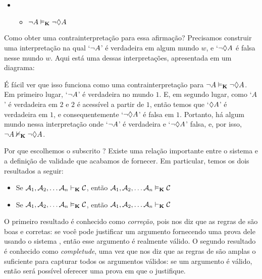 \begin{itemize}
	\item[]
	      \begin{itemize}
		      \item[]$\neg A\vDash_{\mathbf{K}} \neg \Diamond A$
	      \end{itemize}
\end{itemize}
Como obter uma contrainterpretação para essa afirmação? Precisamos construir uma interpretação na qual `$\neg A$' é verdadeira em algum mundo $w$, e `$\neg\Diamond A$ é falsa   nesse mundo $w$. Aqui está uma dessas interpretações, apresentada em um diagrama:
\begin{center}
\end{center}
É fácil ver que isso funciona como uma contrainterpretação para  $\neg A\vDash_{\mathbf{K}}\neg\Diamond A$. Em primeiro lugar, `$\neg A$' é verdadeira no mundo $1$. 
E, em segundo lugar, como `$A$' é verdadeira em $2$ e $2$ é acessível a partir de $1$, então temos que `$\Diamond A$' é verdadeira em $1$, e consequentemente `$\neg\Diamond A$'   é falsa em $1$. 
Portanto, há algum mundo nessa interpretação onde `$\neg A$' é verdadeira e `$\neg\Diamond A$'  falsa, e, por isso,     
$\neg A\nvDash_{\mathbf{K}} \neg \Diamond A$.


Por que escolhemos o subscrito \mlK? Existe uma relação importante entre o sistema \mlK{} e a definição de validade que acabamos de fornecer. Em particular, temos os dois resultados a seguir:
\begin{itemize}
	\item Se $\mathcal{A}_1,\mathcal{A}_2, \dots \mathcal{A}_n\vdash_{\mathbf{K}}\mathcal{C}$, então $\mathcal{A}_1,\mathcal{A}_2, \dots \mathcal{A}_n\vDash_{\mathbf{K}}\mathcal{C}$
	\item Se $\mathcal{A}_1,\mathcal{A}_2, \dots \mathcal{A}_n\vDash_{\mathbf{K}}\mathcal{C}$, então $\mathcal{A}_1,\mathcal{A}_2, \dots \mathcal{A}_n\vdash_{\mathbf{K}}\mathcal{C}$
\end{itemize}
O primeiro resultado é conhecido como \emph{correção}, pois nos diz que as regras de \mlK{} são boas e corretas: se você pode justificar um argumento fornecendo uma prova dele usando o sistema \mlK, então esse argumento é realmente válido. O segundo resultado é conhecido como    \emph{completude}, uma vez que nos diz que as regras de \mlK{} são amplas o suficiente para capturar todos os argumentos válidos: se um argumento é válido, então será possível oferecer uma prova em \mlK{} que o justifique.
 


